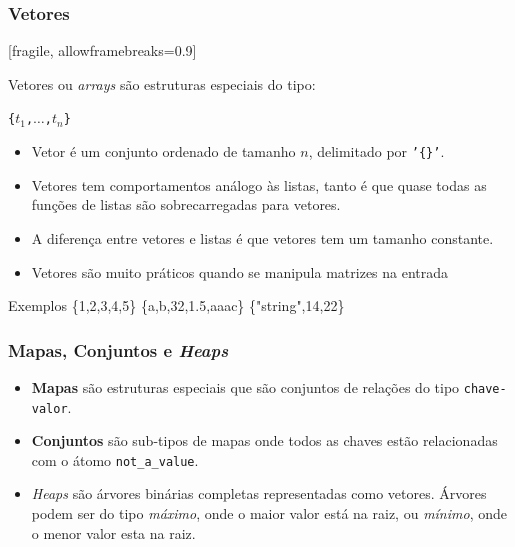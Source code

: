 \begin{frame}
	\frametitle{Vetores} [fragile, allowframebreaks=0.9]
	
	Vetores ou \textit{arrays} são estruturas especiais do tipo:
	\begin{center}
		 \texttt{\{$t_1$,$\ldots$,$t_{n}$\}}
		\end{center}
	
	\begin{itemize}
	 \pause
	   \item Vetor é um conjunto ordenado de tamanho $n$, delimitado por \texttt{'\{\}'}.
	   \item 	Vetores tem comportamentos análogo às listas, tanto é que quase todas as funções de listas
	são sobrecarregadas para vetores. 
	
		   \item A diferença entre vetores e listas é que vetores tem um tamanho  constante.
		   \item Vetores são muito práticos quando se manipula matrizes na entrada
		   
	 \end{itemize} 

	
	\begin{block}{Exemplos}
		\{1,2,3,4,5\} \: \{a,b,32,1.5,aaac\} \: \{"string",14,22\}
	\end{block}
	
\end{frame}


\begin{frame}
	\frametitle{Mapas, Conjuntos e \textit{Heaps}}
	
	\begin{itemize}
		\item \textbf{Mapas} são estruturas especiais que são conjuntos de relações do tipo \texttt{chave-valor}.
		
		\item \textbf{Conjuntos} são sub-tipos de mapas onde todos as chaves estão relacionadas com o átomo 
		\texttt{not\_a\_value}.
		
		\item \textit{Heaps} são árvores binárias completas representadas como vetores.
		Árvores podem ser do tipo \textit{máximo}, onde o maior valor está na raiz, ou \textit{mínimo}, 
		onde o menor valor esta na raiz.
	\end{itemize}
	
\end{frame}

